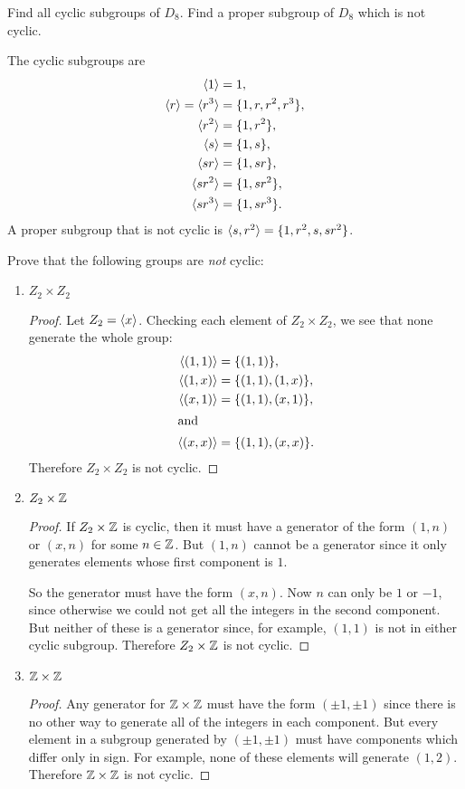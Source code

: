  Find all cyclic subgroups of $D_8$. Find a proper
subgroup of $D_8$ which is not cyclic.
\begin{solution}
  The cyclic subgroups are
  \begin{align*}
    \langle{1}\rangle &= 1, \\
    \langle{r}\rangle = \langle{r^3}\rangle &= \{1, r, r^2, r^3\}, \\
    \langle{r^2}\rangle &= \{1, r^2\}, \\
    \langle{s}\rangle &= \{1, s\}, \\
    \langle{sr}\rangle &= \{1, sr\}, \\
    \langle{sr^2}\rangle &= \{1, sr^2\}, \\
    \langle{sr^3}\rangle &= \{1, sr^3\}.
  \end{align*}
  A proper subgroup that is not cyclic is
  $\langle{s, r^2}\rangle = \{1, r^2, s, sr^2\}$.
\end{solution}

 Prove that the following groups are {\em not} cyclic:
\begin{enumerate}
\item $Z_2\times Z_2$
  \begin{proof}
    Let $Z_2 = \langle{x}\rangle$. Checking each element of $Z_2\times Z_2$, we
    see that none generate the whole group:
    \begin{align*}
      \langle{(1,1)}\rangle &= \{(1,1)\}, \\
      \langle{(1,x)}\rangle &= \{(1,1), (1,x)\}, \\
      \langle{(x,1)}\rangle &= \{(1,1), (x,1)\}, \\
      \intertext{and}
      \langle{(x,x)}\rangle &= \{(1,1), (x,x)\}.
    \end{align*}
    Therefore $Z_2\times Z_2$ is not cyclic.
  \end{proof}
\item $Z_2\times\mathbb{Z}$
  \begin{proof}
    If $Z_2\times\mathbb{Z}$ is cyclic, then it must have a generator of the
    form $(1, n)$ or $(x, n)$ for some $n\in\mathbb{Z}$. But $(1,n)$ cannot be
    a generator since it only generates elements whose first component
    is $1$.

    So the generator must have the form $(x,n)$. Now $n$ can only be
    $1$ or $-1$, since otherwise we could not get all the integers in
    the second component. But neither of these is a generator since,
    for example, $(1,1)$ is not in either cyclic subgroup. Therefore
    $Z_2\times\mathbb{Z}$ is not cyclic.
  \end{proof}
\item $\mathbb{Z}\times\mathbb{Z}$
  \begin{proof}
    Any generator for $\mathbb{Z}\times\mathbb{Z}$ must have the form $(\pm1,\pm1)$
    since there is no other way to generate all of the integers in
    each component. But every element in a subgroup generated by
    $(\pm1,\pm1)$ must have components which differ only in sign. For
    example, none of these elements will generate $(1,2)$. Therefore
    $\mathbb{Z}\times\mathbb{Z}$ is not cyclic.
  \end{proof}
\end{enumerate}

